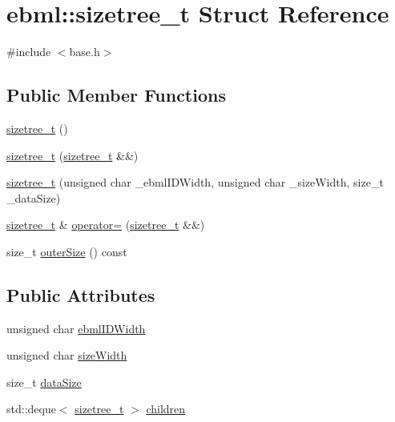 \hypertarget{structebml_1_1sizetree__t}{}\section{ebml\+:\+:sizetree\+\_\+t Struct Reference}
\label{structebml_1_1sizetree__t}


{\ttfamily \#include $<$base.\+h$>$}

\subsection*{Public Member Functions}
\begin{DoxyCompactItemize}
\item 
\mbox{\hyperlink{structebml_1_1sizetree__t_ab6a2ee51cb1c9932e9db7c52f2a7caa1}{sizetree\+\_\+t}} ()
\item 
\mbox{\hyperlink{structebml_1_1sizetree__t_a742d446b695e31087692e335e6935ae2}{sizetree\+\_\+t}} (\mbox{\hyperlink{structebml_1_1sizetree__t}{sizetree\+\_\+t}} \&\&)
\item 
\mbox{\hyperlink{structebml_1_1sizetree__t_a41a80e1f9dbb5e031288a759f516abb5}{sizetree\+\_\+t}} (unsigned char \+\_\+ebml\+I\+D\+Width, unsigned char \+\_\+size\+Width, size\+\_\+t \+\_\+data\+Size)
\item 
\mbox{\hyperlink{structebml_1_1sizetree__t}{sizetree\+\_\+t}} \& \mbox{\hyperlink{structebml_1_1sizetree__t_a48e8c0b46c4dbf6a6aa467b3c8f5d896}{operator=}} (\mbox{\hyperlink{structebml_1_1sizetree__t}{sizetree\+\_\+t}} \&\&)
\item 
size\+\_\+t \mbox{\hyperlink{structebml_1_1sizetree__t_acbebda277c477cf6872985ee556bf329}{outer\+Size}} () const
\end{DoxyCompactItemize}
\subsection*{Public Attributes}
\begin{DoxyCompactItemize}
\item 
unsigned char \mbox{\hyperlink{structebml_1_1sizetree__t_a70bc5a5a11af951bf7ba77985677f499}{ebml\+I\+D\+Width}}
\item 
unsigned char \mbox{\hyperlink{structebml_1_1sizetree__t_a356c9d27fc953d49d010f4dc75438142}{size\+Width}}
\item 
size\+\_\+t \mbox{\hyperlink{structebml_1_1sizetree__t_ae6c505c09eae23cff574b42cccec1c30}{data\+Size}}
\item 
std\+::deque$<$ \mbox{\hyperlink{structebml_1_1sizetree__t}{sizetree\+\_\+t}} $>$ \mbox{\hyperlink{structebml_1_1sizetree__t_a5b13f1d6e607ba1b44be5ed3ccff549f}{children}}
\end{DoxyCompactItemize}


